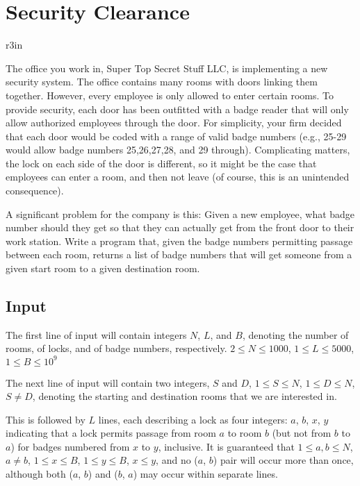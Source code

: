 \documentclass[11pt]{article}
\begin{document}
\section*{Security Clearance}


\begin{wrapfigure}{r}{3in}
\vspace{-10pt}
\vspace{-30pt}
\end{wrapfigure}

The office you work in, Super Top Secret Stuff LLC, is implementing a new security system. The office contains many rooms with doors linking them together. However, every employee is only allowed to enter certain rooms. To provide security, each door has been outfitted with a badge reader that will only allow authorized employees through the door. For simplicity, your firm decided that each door would be coded with a range of valid badge numbers (e.g., 25-29 would allow badge numbers 25,26,27,28, and 29 through). Complicating matters, the lock on each side of the door is different, so it might be the case that employees can enter a room, and then not leave (of course, this is an unintended consequence).

A significant problem for the company is this: Given a new employee, what badge number should they get so that they can actually get from the front door to their work station. Write a program that, given the badge numbers permitting passage between each room, returns a list of badge numbers that will get someone from a given start room to a given destination room.

\subsection*{Input}
The first line of input will contain integers $N$, $L$, and $B$, denoting the number of rooms, of locks, and of badge numbers, respectively. $2 \leq N \leq 1000$, $1 \leq L \leq 5000$, $1 \leq B \leq 10^9$

The next line of input will contain two integers, $S$ and $D$, $1 \leq S \leq N$, $1 \leq D \leq N$, $S \neq D$, denoting the starting and destination rooms that we are interested in.

This is followed by $L$ lines, each describing a lock as four integers: $a$, $b$, $x$, $y$ indicating that a lock permits passage from room $a$ to room $b$ (but not from $b$ to $a$) for badges numbered from $x$ to $y$, inclusive. It is guaranteed that $1 \leq a,b \leq N$, $a \neq b$, $1 \leq x \leq B$, $1 \leq y \leq B$, $x \leq y$, and no ($a$, $b$) pair will occur more than once, although both ($a$, $b$) and ($b$, $a$) may occur within separate lines.
\end{document}
